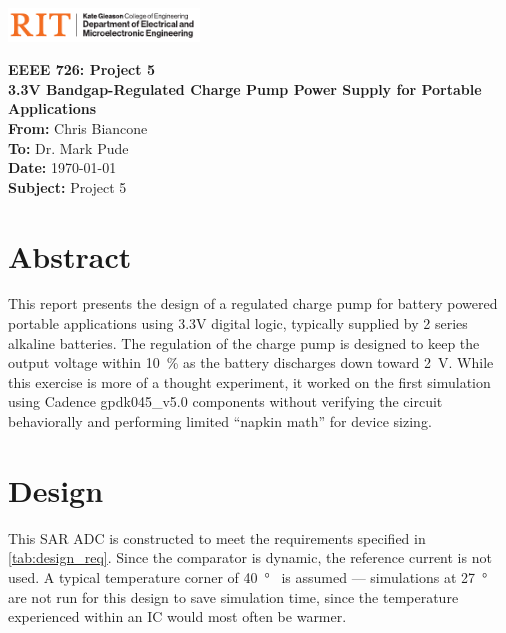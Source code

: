 \documentclass[11pt,letterpaper]{article}
\begin{document}
\VerbatimFootnotes %


	\hspace{4.5in}
	\includegraphics[width=2in,trim=0cm 0in 0in 0.0in,clip]{images/COE_EME_1505C_hor_k1.pdf}
\newline

\Huge\textbf{EEEE 726: Project 5 \\3.3V Bandgap-Regulated Charge Pump Power Supply for Portable Applications}\\

\Large
\textbf{From:} Chris Biancone \\
\textbf{To: } Dr. Mark Pude \\
\textbf{Date: } \today \\
\textbf{Subject: } Project 5\\
\vspace{0.5in}

\section*{Abstract}
\normalsize
This report presents the design of a regulated charge pump for battery powered portable applications using 3.3V digital logic, typically supplied by 2 series alkaline batteries. The regulation of the charge pump is designed to keep the output voltage within \qty{10}{\%} as the battery discharges down toward \qty{2}{\V}. While this exercise is more of a thought experiment, it worked on the first simulation using Cadence gpdk045\_v5.0 components without verifying the circuit behaviorally and performing limited ``napkin math'' for device sizing.


\section{Design}

This SAR ADC is constructed to meet the requirements specified in \cref{tab:design_req}. Since the comparator is dynamic, the reference current is not used. A typical temperature corner of \qty{40}{\degree\C} is assumed --- simulations at \qty{27}{\degree\C} are not run for this design to save simulation time, since the temperature experienced within an IC would most often be warmer.
\end{document}
